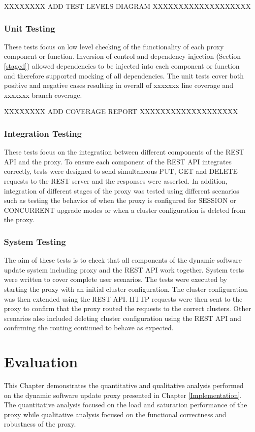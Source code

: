 \documentclass[a4paper,11pt,twoside]{report}
\begin{document}
XXXXXXXX ADD TEST LEVELS DIAGRAM  XXXXXXXXXXXXXXXXXXX\bigskip

\subsection{Unit Testing}
These tests focus on low level checking of the functionality of each proxy component or function. Inversion-of-control and dependency-injection (Section \ref{staged}) allowed dependencies to be injected into each component or function and therefore supported mocking of all dependencies. The unit tests cover both positive and negative cases resulting in overall of xxxxxxx line coverage and xxxxxxx branch coverage.\bigskip    

XXXXXXXX ADD COVERAGE REPORT XXXXXXXXXXXXXXXXXXX\bigskip

\subsection{Integration Testing}
These tests focus on the integration between different components of the REST API and the proxy. To ensure each component of the REST API integrates correctly, tests were designed to send simultaneous PUT, GET and DELETE requests to the REST server and the responses were asserted. In addition, integration of different stages of the proxy was tested using different scenarios such as testing the behavior of when the proxy is configured for SESSION or CONCURRENT upgrade modes or when a cluster configuration is deleted from the proxy.

\subsection{System Testing}
The aim of these tests is to check that all components of the dynamic software update system including proxy and the REST API work together. System tests were written to cover complete user scenarios. The tests were executed by starting the proxy with an initial cluster configuration. The cluster configuration was then extended using the REST API.  HTTP requests were then sent to the proxy to confirm that the proxy routed the requests to the correct clusters.  Other scenarios also included deleting cluster configuration using the REST API and confirming the routing continued to behave as expected.

\clearpage

\chapter{Evaluation}
This Chapter demonstrates the quantitative and qualitative analysis performed on the dynamic software update proxy presented in Chapter \ref{Implementation}. The quantitative analysis focused on the load and saturation performance of the proxy while qualitative analysis focused on the functional correctness and robustness of the proxy. 
\end{document}
